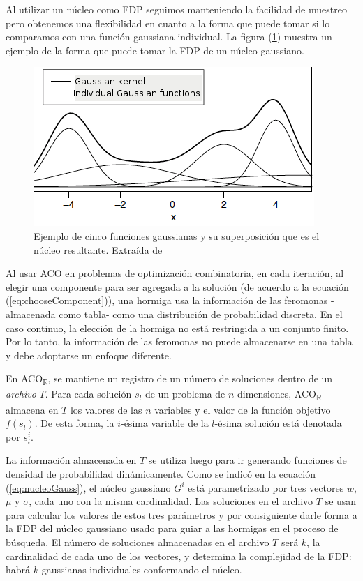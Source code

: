 \documentclass{llncs}
\begin{document}
	Al utilizar un núcleo como FDP seguimos manteniendo la facilidad de muestreo pero obtenemos una flexibilidad en cuanto a la forma que puede tomar si lo comparamos con una función gaussiana individual. La figura (\ref{fig:gaussianKernel}) muestra un ejemplo de la forma que puede tomar la FDP de un núcleo gaussiano. 
	
	\begin{figure}[H]
		\centering
		\includegraphics[scale=0.5]{gaussianKernel.png}
		\caption{Ejemplo de cinco funciones gaussianas y su superposición que es el núcleo resultante. Extraída de \cite{soc:dor}}
		\label{fig:gaussianKernel}
	\end{figure}

	Al usar ACO en problemas de optimización combinatoria, en cada iteración, al elegir una componente para ser agregada
	a la solución (de acuerdo a la ecuación (\ref{eq:chooseComponent})), una hormiga usa la información de las feromonas
	-almacenada como tabla- como una distribución de probabilidad discreta. En el caso continuo, la elección de la hormiga
	no está restringida a un conjunto finito. Por lo tanto, la información de las feromonas no puede almacenarse en una tabla
	y debe adoptarse un enfoque diferente.
	
	En ACO\textsubscript{$\mathbb{R}$}, se mantiene un registro de un número de soluciones dentro de un \textit{archivo} $T$. Para cada solución
	$s_l$ de un problema de $n$ dimensiones, ACO\textsubscript{$\mathbb{R}$} almacena en $T$ los valores de las $n$ variables y el valor de la
	función objetivo $f(s_l)$. De esta forma, la $i$-ésima variable de la $l$-ésima solución está denotada por $s_l^i$.
	
	La información almacenada en $T$ se utiliza luego para ir generando funciones de densidad de probabilidad dinámicamente. Como se
	indicó en la ecuación (\ref{eq:nucleoGauss}), el núcleo gaussiano $G^i$ está parametrizado por tres vectores $w$, $\mu$ y $\sigma$,
	cada uno con la misma cardinalidad. Las soluciones en el archivo $T$ se usan para calcular los valores de estos 
	tres parámetros y por consiguiente darle forma a la FDP del núcleo gaussiano usado para guiar a las hormigas en el proceso de búsqueda. El número de 	soluciones almacenadas en el archivo $T$ será $k$, la cardinalidad de cada uno de los vectores, y determina
	la complejidad de la FDP: habrá $k$ gaussianas individuales conformando el núcleo.
	
\end{document}
